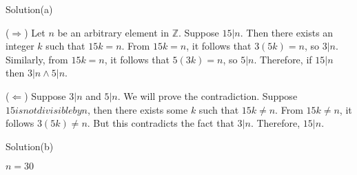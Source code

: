 \documentclass{article}
\begin{document}
Solution(a)

($\Rightarrow$) Let $n$ be an arbitrary element in $\mathbb{Z}$.
Suppose $15 | n$. Then there exists an integer $k$ such that $15k =
n$. From $15k = n$, it follows that $3(5k) = n$, so $3 | n$.
Similarly, from $15k = n$, it follows that $5(3k) = n$, so $5|n$.
Therefore, if $15 | n$ then $3|n \land 5|n$.

($\Leftarrow$) Suppose $3|n$ and $5|n$. We will prove the
contradiction. Suppose $15 is not divisible by n$, then there exists
some $k$ such that $15 k \neq n$. From $15k \neq n$, it follows $3(5k)
\neq n$. But this contradicts the fact that $3|n$. Therefore, $15 |
n$.

Solution(b)

$n = 30$
\end{document}
